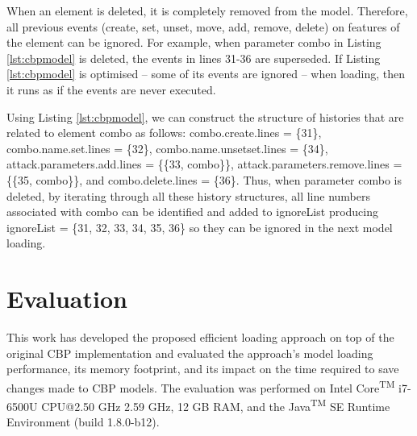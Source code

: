   When an element is deleted, it is completely removed from the model. Therefore, all previous events (\textsf{create}, \textsf{set}, \textsf{unset}, \textsf{move}, \textsf{add}, \textsf{remove}, \textsf{delete}) on features of the element can be ignored. For example, when parameter \textsf{combo} in Listing \ref{lst:cbpmodel} is deleted, the events in lines 31-36 are superseded. If Listing \ref{lst:cbpmodel} is optimised -- some of its events are ignored -- when loading, then it runs as if the events are never executed.
  
  
Using Listing \ref{lst:cbpmodel}, we can construct the structure of histories that are related to element \textsf{combo} as follows: \textsf{combo}.\textsf{create}.\textsf{lines} = \{31\}, \textsf{combo}.\textsf{name}.\textsf{set}.\textsf{lines} = \{32\},
\textsf{combo}.\textsf{name}.\textsf{unsetset}.\textsf{lines} = \{34\}, \textsf{attack}.\textsf{parameters}.\textsf{add}.\textsf{lines} = \{\{33, \textsf{combo}\}\}, \textsf{attack}.\textsf{parameters}.\textsf{remove}.\textsf{lines} = \{\{35, \textsf{combo}\}\}, and \textsf{combo}.\textsf{delete}.\textsf{lines} = \{36\}. Thus, when parameter \textsf{combo} is deleted, by iterating through all these history structures, all line numbers associated with \textsf{combo} can be identified and added to \textsf{ignoreList} producing \textsf{ignoreList} = \{31, 32, 33, 34, 35, 36\} so they can be ignored in the next model loading.
  
  \section{Evaluation}
  \label{sec:evaluation_4}
  
  This work has developed the proposed efficient loading approach on top of the original CBP implementation \cite{DBLP:conf/models/YohannisKP17,epsilonlabs2019emfcbp} and evaluated the approach’s model loading performance, its memory footprint, and its impact on the time required to save changes made to CBP models. The evaluation was performed on Intel\textsuperscript{\textregistered} Core\textsuperscript{TM} i7-6500U CPU@2.50 GHz 2.59 GHz, 12 GB RAM, and the Java\textsuperscript{TM} SE Runtime Environment (build 1.8.0-b12).
  

